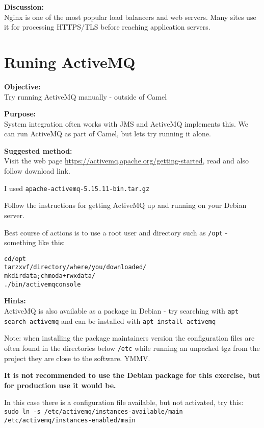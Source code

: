 \documentclass[a4paper,11pt,notitlepage]{report}
\begin{document}
{\bf Discussion:}\\
Nginx is one of the most popular load balancers and web servers. Many sites use it for processing HTTPS/TLS before reaching application servers.







\chapter{Runing ActiveMQ}
\label{ex:activemq-install}


{\bf Objective:}\\
Try running ActiveMQ manually - outside of Camel

{\bf Purpose:}\\
System integration often works with JMS and ActiveMQ implements this.
We can run ActiveMQ as part of Camel, but lets try running it alone.

{\bf Suggested method:}\\
Visit the web page \url{https://activemq.apache.org/getting-started}, read and also follow download link.

I used \verb+apache-activemq-5.15.11-bin.tar.gz+

Follow the instructions for getting ActiveMQ up and running on your Debian server.

Best course of actions is to use a root user and directory such as \verb+/opt+ - something like this:

\begin{alltt}
cd /opt
tar zxvf /directory/where/you/downloaded/
mkdir data;chmod a+rwx data/
./bin/activemq console
\end{alltt}


{\bf Hints:}\\
ActiveMQ is also available as a package in Debian - try searching with \verb+apt search activemq+
and can be installed with \verb+apt install activemq+

Note: when installing the package maintainers version the configuration files are often found in the directories below \verb+/etc+ while running an unpacked tgz from the project they are close to the software. YMMV.

{\bf It is not recommended to use the Debian package for this exercise, but for production use it would be.}

In this case there is a configuration file available, but not activated, try this:\\
\verb+sudo ln -s /etc/activemq/instances-available/main /etc/activemq/instances-enabled/main+
\end{document}
